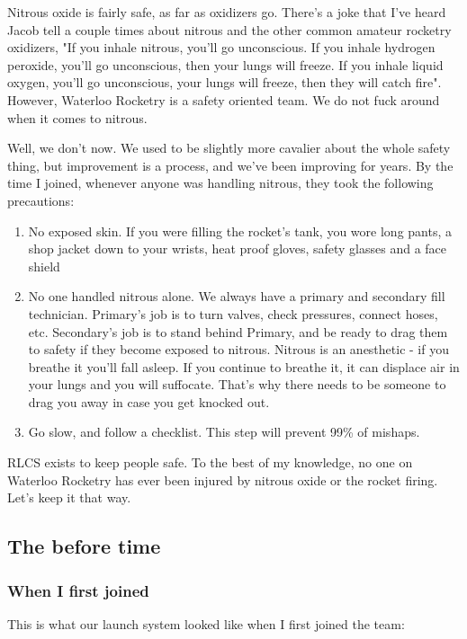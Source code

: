 \documentclass[11pt]{article}
\begin{document}
Nitrous oxide is fairly safe, as far as oxidizers go. There's a joke that I've
heard Jacob tell a couple times about nitrous and the other common amateur
rocketry oxidizers, "If you inhale nitrous, you'll go unconscious. If you inhale
hydrogen peroxide, you'll go unconscious, then your lungs will freeze. If you
inhale liquid oxygen, you'll go unconscious, your lungs will freeze, then they
will catch fire". However, Waterloo Rocketry is a safety oriented team. We do
not fuck around when it comes to nitrous.

Well, we don't now. We used to be slightly more cavalier about the whole safety
thing, but improvement is a process, and we've been improving for years. By the
time I joined, whenever anyone was handling nitrous, they took the following
precautions:

\begin{enumerate}
\item No exposed skin. If you were filling the rocket's tank, you wore long pants,
a shop jacket down to your wrists, heat proof gloves, safety glasses and a
face shield
\item No one handled nitrous alone. We always have a primary and secondary fill
technician. Primary's job is to turn valves, check pressures, connect hoses,
etc. Secondary's job is to stand behind Primary, and be ready to drag them to
safety if they become exposed to nitrous. Nitrous is an anesthetic - if you
breathe it you'll fall asleep. If you continue to breathe it, it can displace
air in your lungs and you will suffocate. That's why there needs to be
someone to drag you away in case you get knocked out.
\item Go slow, and follow a checklist. This step will prevent 99\% of mishaps.
\end{enumerate}

RLCS exists to keep people safe. To the best of my knowledge, no one
on Waterloo Rocketry has ever been injured by nitrous oxide or the
rocket firing. Let's keep it that way.

\subsection{The before time}
\label{sec:org6ccceae}
\subsubsection{When I first joined}
\label{sec:org2dc453a}

This is what our launch system looked like when I first joined the team:
\end{document}
